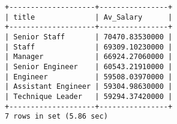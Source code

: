 \documentclass[]{article}
\begin{document}
\begin{enumerate}
\begin{verbatim}
+--------------------+----------------+
| title              | Av_Salary      |
+--------------------+----------------+
| Senior Staff       | 70470.83530000 |
| Staff              | 69309.10230000 |
| Manager            | 66924.27060000 |
| Senior Engineer    | 60543.21910000 |
| Engineer           | 59508.03970000 |
| Assistant Engineer | 59304.98630000 |
| Technique Leader   | 59294.37420000 |
+--------------------+----------------+
7 rows in set (5.86 sec)
\end{verbatim}

\end{enumerate}
\end{document}
